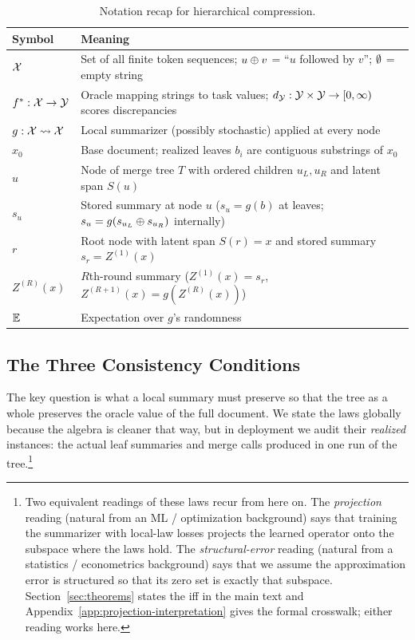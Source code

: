 \begin{table}[htbp]
\centering\small
\begin{tabular}{ll}
\toprule
Symbol & Meaning \\
\midrule
$\mathcal{X}$ & Set of all finite token sequences; $u \oplus v$ = ``$u$ followed by $v$''; $\emptyset$ = empty string \\
$f^\ast: \mathcal{X} \to \mathcal{Y}$ & Oracle mapping strings to task values; $d_{\mathcal{Y}}: \mathcal{Y} \times \mathcal{Y} \to [0,\infty)$ scores discrepancies \\
$g: \mathcal{X} \rightsquigarrow \mathcal{X}$ & Local summarizer (possibly stochastic) applied at every node \\
$x_0$ & Base document; realized leaves $b_i$ are contiguous substrings of $x_0$ \\
$u$ & Node of merge tree $T$ with ordered children $u_L,u_R$ and latent span $S(u)$ \\
$s_u$ & Stored summary at node $u$ ($s_u=g(b)$ at leaves; $s_u=g(s_{u_L}\oplus s_{u_R})$ internally) \\
$r$ & Root node with latent span $S(r)=x$ and stored summary $s_r = Z^{(1)}(x)$ \\
$Z^{(R)}(x)$ & $R$th-round summary ($Z^{(1)}(x)=s_r$, $Z^{(R+1)}(x)=g(Z^{(R)}(x))$) \\
$\mathbb{E}$ & Expectation over $g$'s randomness \\
\bottomrule
\end{tabular}
\caption{Notation recap for hierarchical compression.}
\label{tab:notation-main}
\end{table}

\subsection{The Three Consistency Conditions}

The key question is what a local summary must preserve so that the tree as a whole preserves the oracle value of the full document. We state the laws globally because the algebra is cleaner that way, but in deployment we audit their \emph{realized} instances: the actual leaf summaries and merge calls produced in one run of the tree.\footnote{Two equivalent readings of these laws recur from here on. The \emph{projection} reading (natural from an ML / optimization background) says that training the summarizer with local-law losses projects the learned operator onto the subspace where the laws hold. The \emph{structural-error} reading (natural from a statistics / econometrics background) says that we assume the approximation error is structured so that its zero set is exactly that subspace. Section~\ref{sec:theorems} states the iff in the main text and Appendix~\ref{app:projection-interpretation} gives the formal crosswalk; either reading works here.}

